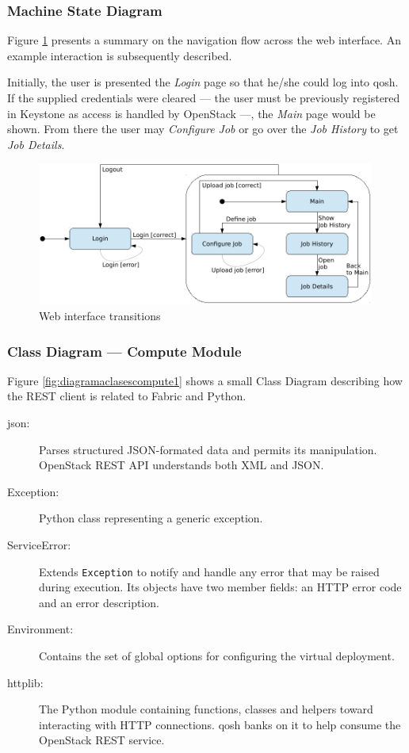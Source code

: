 \subsubsection{Machine State Diagram}\label{subsubsec:navegacion}
\noindent Figure \ref{fig:navegacion} presents a summary on the navigation flow across the web interface. An example interaction is subsequently described.

Initially, the user is presented the \emph{Login} page so that he/she could log into qosh. If the supplied credentials were cleared --- the user must be previously registered in Keystone as access is handled by OpenStack ---, the \emph{Main} page would be shown. From there the user may \emph{Configure Job} or go over the \emph{Job History} to get \emph{Job Details}.

\begin{figure}[tbp]
\begin{center}
\includegraphics[width=0.99\textwidth]{imagenes/026.pdf}
 \caption{Web interface transitions}
\label{fig:navegacion}
\end{center}
\end{figure}

\subsubsection{Class Diagram --- Compute Module}\label{subsubsec:diagramaclasescompute}
\noindent Figure \ref{fig:diagramaclasescompute1} shows a small Class Diagram describing how the REST client is related to Fabric and Python.

\begin{description}
 \item[json:] Parses structured JSON-formated data and permits its manipulation. OpenStack REST API understands both XML and JSON.
 \item[Exception:] Python class representing a generic exception.
 \item[ServiceError:] Extends \texttt{Exception} to notify and handle any error that may be raised during execution. Its objects have two member fields: an HTTP error code and an error description.
 \item[Environment:] Contains the set of global options for configuring the virtual deployment.
 \item[httplib:] The Python module containing functions, classes and helpers toward interacting with HTTP connections. qosh banks on it to help consume the OpenStack REST service.
\end{description}

